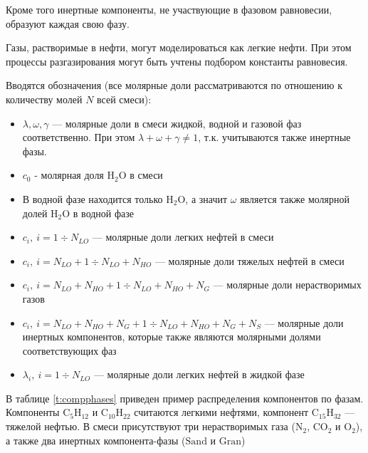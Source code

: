 \documentclass[12pt]{article}
\let\dividesymbol\div
\renewcommand{\div}{\operatorname{div}}
\begin{document}
Кроме того инертные компоненты, не участвующие в фазовом равновесии, образуют каждая свою фазу.

Газы, растворимые в нефти, могут моделироваться как легкие нефти. При этом процессы разгазирования могут быть учтены подбором константы равновесия.

Вводятся обозначения (все молярные доли рассматриваются по отношению к количеству молей $N$ всей смеси):
\begin{itemize}
\item $\lambda, \omega, \gamma$ --- молярные доли в смеси жидкой, водной и газовой фаз соответственно. При этом $\lambda + \omega + \gamma \ne 1$, т.к. учитываются также инертные фазы.
\item $c_0$ - молярная доля $\mathrm{H_2O}$ в смеси
\item В водной фазе находится только $\mathrm{H_2O}$, а значит $\omega$ является также молярной долей $\mathrm{H_2O}$ в водной фазе
\item $c_i, \: i = 1 \dividesymbol N_{LO}$ --- молярные доли легких нефтей в смеси
\item $c_i, \: i = N_{LO} + 1 \dividesymbol N_{LO} + N_{HO}$ --- молярные доли тяжелых нефтей в смеси
\item $c_i, \: i = N_{LO} + N_{HO} + 1 \dividesymbol N_{LO} + N_{HO} + N_G$ --- молярные доли нерастворимых газов
\item $c_i, \: i = N_{LO} + N_{HO} + N_G + 1 \dividesymbol N_{LO} + N_{HO} + N_G + N_S$ --- молярные доли инертных компонентов, которые также являются молярными долями соответствующих фаз
\item $\lambda_i, \: i = 1 \dividesymbol N_{LO}$ --- молярные доли легких нефтей в жидкой фазе
\end{itemize}

В таблице \ref{t:compphases} приведен пример распределения компонентов по фазам. Компоненты $\mathrm{C_5H_{12}}$ и $\mathrm{C_{10}H_{22}}$ считаются легкими нефтями, компонент $\mathrm{C_{15}H_{32}}$ --- тяжелой нефтью. В смеси присутствуют три нерастворимых газа ($\mathrm{N_2}$, $\mathrm{CO_2}$ и $\mathrm{O_2}$), а также два инертных компонента-фазы ($\mathrm{Sand}$ и $\mathrm{Gran}$)
\end{document}
